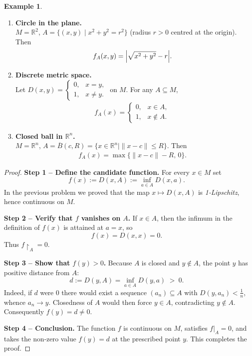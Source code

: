 \documentclass[12pt]{article}
\theoremstyle{definition} %
\newtheorem{example}{Example}
\theoremstyle{plain} %
\begin{document}
\begin{example}
\begin{enumerate}
      \item \textbf{Circle in the plane.}\\
            $M=\mathbb R^{2}$,  
            $A=\{(x,y)\mid x^{2}+y^{2}=r^{2}\}$ (radius $r>0$ centred at the origin).  
            Then
            \begin{align}
                f_A(x,y)=\Bigl|\sqrt{x^{2}+y^{2}}-r\Bigr|.
            \end{align}

      \item \textbf{Discrete metric space.}\\
            Let $D(x,y)=\begin{cases}0,&x=y,\\ 1,&x\neq y.\end{cases}$ on $M$.  
            For any $A\subseteq M$,
            \begin{align}
                f_A(x)=
                \begin{cases}
                    0, & x\in A,\\[4pt]
                    1, & x\notin A.
                \end{cases}
            \end{align}

      \item \textbf{Closed ball in $\mathbb R^{n}$.}\\
            $M=\mathbb R^{n}$,   
            $A=\overline{B}(c,R)=\{x\in\mathbb R^{n}\mid \|x-c\|\le R\}$.  Then
            \begin{align}
                f_A(x)=\max\{\|x-c\|-R,\,0\}.
            \end{align}
  \end{enumerate}
\end{example}
\begin{proof}
  \textbf{Step 1 – Define the candidate function.}  
  For every $x\in M$ set
  \[
      f(x):=D(x,A):=\inf_{a\in A}D(x,a).
  \]
  In the previous problem we proved that the map
  $x\mapsto D(x,A)$ is \emph{1‑Lipschitz}, hence continuous on $M$.

  \medskip
  \textbf{Step 2 – Verify that $f$ vanishes on $A$.}  
  If $x\in A$, then the infimum in the definition of $f(x)$ is attained at
  $a=x$, so
  \[
      f(x)=D(x,x)=0 .
  \]
  Thus $f\!\restriction_{A}=0$.

  \medskip
  \textbf{Step 3 – Show that $f(y)>0$.}  
  Because $A$ is closed and $y\notin A$, the point $y$ has positive
  distance from $A$:
  \[
      d:=D(y,A)=\inf_{a\in A}D(y,a)\;>\;0.
  \]
  Indeed, if $d$ were $0$ there would exist a sequence $(a_n)\subseteq A$
  with $D(y,a_n)<\tfrac1n$, whence $a_n\to y$.  
  Closedness of $A$ would then force $y\in A$, contradicting $y\notin A$.
  Consequently $f(y)=d\neq 0$.

  \medskip
  \textbf{Step 4 – Conclusion.}  
  The function $f$ is continuous on $M$, satisfies $f|_{A}=0$, and takes
  the non‑zero value $f(y)=d$ at the prescribed point $y$.  This completes
  the proof.
\end{proof}
\end{document}
